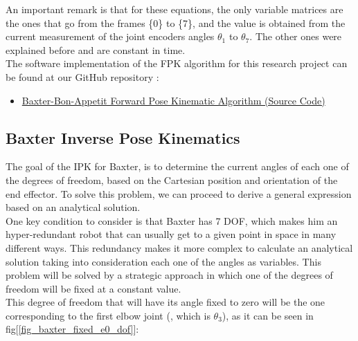 \documentclass[11pt]{report} %
\begin{document}
An important remark is that for these equations, the only variable matrices are the ones that go from the frames \{0\} to \{7\}, and the value is obtained from the current measurement of the joint encoders angles $\theta_{1}$ to $\theta_{7}$. The other ones were explained before and are constant in time.\\

The software implementation of the FPK algorithm for this research project can be found at our GitHub repository :

\begin{itemize}
    \color{blue}
    \item \href{https://github.com/san99tiago/baxter-bon-appetit/blob/main/python/baxter_bon_appetit/src/baxter_essentials/baxter_fpk.py}{Baxter-Bon-Appetit Forward Pose Kinematic Algorithm (Source Code)}
\end{itemize}


\subsection{Baxter Inverse Pose Kinematics}

The goal of the IPK for Baxter, is to determine the current angles of each one of the degrees of freedom, based on the Cartesian position and orientation of the end effector. To solve this problem, we can proceed to derive a general expression based on an analytical solution.\\

One key condition to consider is that Baxter has 7 DOF, which makes him an hyper-redundant robot that can usually get to a given point in space in many different ways. This redundancy makes it more complex to calculate an analytical solution taking into consideration each one of the angles as variables. This problem will be solved by a strategic approach in which one of the degrees of freedom will be fixed at a constant value.\\

This degree of freedom that will have its angle fixed to zero will be the one corresponding to the first elbow joint (, which is $\theta_{3}$), as it can be seen in fig[\ref{fig_baxter_fixed_e0_dof}]:
\end{document}
